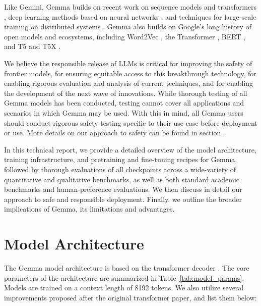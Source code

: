 \documentclass[11pt, a4paper, logo, twocolumn, copyright, nonumbering]{googledeepmind}
\begin{document}
Like Gemini, Gemma builds on recent work on sequence models \citep{DBLP:journals/corr/SutskeverVL14} and transformers \citep{DBLP:journals/corr/VaswaniSPUJGKP17}, deep learning methods based on neural networks \citep{deeplearningLeCun}, and techniques for large-scale training on distributed systems \citep{barham2022pathways, bradburyJAX, NIPS2012_6aca9700}. Gemma also builds on Google's long history of open models and ecosystems, including Word2Vec \citep{word2vec}, the Transformer \citep{DBLP:journals/corr/VaswaniSPUJGKP17}, BERT \citep{bert}, and T5 \citep{t5} and T5X \citep{t5x}.

We believe the responsible release of LLMs is critical for improving the safety of frontier models, for ensuring equitable access to this breakthrough technology, for enabling rigorous evaluation and analysis of current techniques, and for enabling the development of the next wave of innovations. While thorough testing of all Gemma models has been conducted, testing cannot cover all applications and scenarios in which Gemma may be used. With this in mind, all Gemma users should conduct rigorous safety testing specific to their use case before deployment or use. More details on our approach to safety can be found in section .

In this technical report, we provide a detailed overview of the model architecture, training infrastructure, and pretraining and fine-tuning recipes for Gemma, followed by thorough evaluations of all checkpoints across a wide-variety of quantitative and qualitative benchmarks, as well as both standard academic benchmarks and human-preference evaluations. We then discuss in detail our approach to safe and responsible deployment. Finally, we outline the broader implications of Gemma, its limitations and advantages.
\section{Model Architecture}
The Gemma model architecture is based on the transformer decoder \citep{DBLP:journals/corr/VaswaniSPUJGKP17}. The core parameters of the architecture are summarized in Table~\ref{tab:model_params}. Models are trained on a context length of 8192 tokens.
We also utilize several improvements proposed after the original transformer paper, and list them below:
\end{document}
